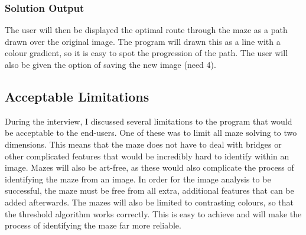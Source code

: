 \documentclass[titlepage]{article}
\begin{document}
\subsubsection{Solution Output}
The user will then be displayed the optimal route through the maze as a path drawn over the original image. The program will drawn this as a line with a colour gradient, so it is easy to spot the progression of the path. The user will also be given the option of saving the new image (need 4).


\subsection{Acceptable Limitations}
During the interview, I discussed several limitations to the program that would be acceptable to the end-users. One of these was to limit all maze solving to two dimensions. This means that the maze does not have to deal with bridges or other complicated features that would be incredibly hard to identify within an image. Mazes will also be art-free, as these would also complicate the process of identifying the maze from an image. In order for the image analysis to be successful, the maze must be free from all extra, additional features that can be added afterwards. The mazes will also be limited to contrasting colours, so that the threshold algorithm works correctly. This is easy to achieve and will make the process of identifying the maze far more reliable. 
\end{document}
